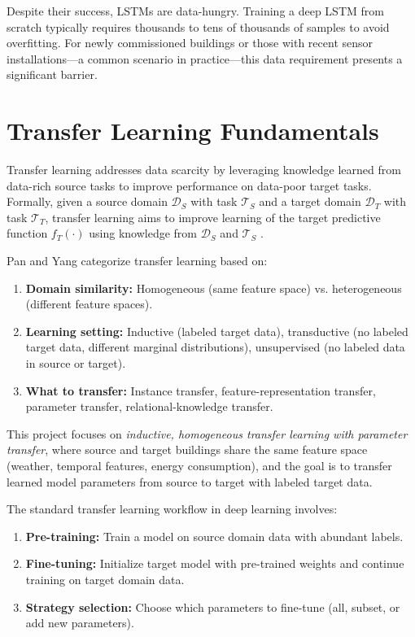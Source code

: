 \documentclass[12pt,a4paper]{report}
\begin{document}
Despite their success, LSTMs are data-hungry. Training a deep LSTM from scratch typically requires thousands to tens of thousands of samples to avoid overfitting. For newly commissioned buildings or those with recent sensor installations—a common scenario in practice—this data requirement presents a significant barrier.

\section{Transfer Learning Fundamentals}

Transfer learning addresses data scarcity by leveraging knowledge learned from data-rich source tasks to improve performance on data-poor target tasks. Formally, given a source domain \(\mathcal{D}_S\) with task \(\mathcal{T}_S\) and a target domain \(\mathcal{D}_T\) with task \(\mathcal{T}_T\), transfer learning aims to improve learning of the target predictive function \(f_T(\cdot)\) using knowledge from \(\mathcal{D}_S\) and \(\mathcal{T}_S\) \cite{pan2010survey}.

Pan and Yang \cite{pan2010survey} categorize transfer learning based on:

\begin{enumerate}
    \item \textbf{Domain similarity:} Homogeneous (same feature space) vs. heterogeneous (different feature spaces).
    \item \textbf{Learning setting:} Inductive (labeled target data), transductive (no labeled target data, different marginal distributions), unsupervised (no labeled data in source or target).
    \item \textbf{What to transfer:} Instance transfer, feature-representation transfer, parameter transfer, relational-knowledge transfer.
\end{enumerate}

This project focuses on \textit{inductive, homogeneous transfer learning with parameter transfer}, where source and target buildings share the same feature space (weather, temporal features, energy consumption), and the goal is to transfer learned model parameters from source to target with labeled target data.

The standard transfer learning workflow in deep learning involves:

\begin{enumerate}
    \item \textbf{Pre-training:} Train a model on source domain data with abundant labels.
    \item \textbf{Fine-tuning:} Initialize target model with pre-trained weights and continue training on target domain data.
    \item \textbf{Strategy selection:} Choose which parameters to fine-tune (all, subset, or add new parameters).
\end{enumerate}
\end{document}
